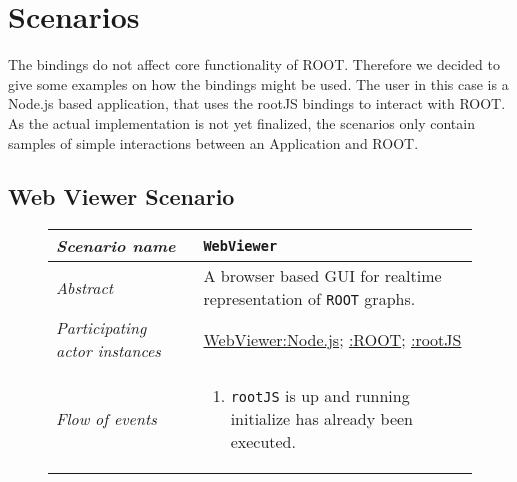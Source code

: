 \section{Scenarios}

The bindings do not affect core functionality of ROOT. Therefore 
we decided to give some examples on how the bindings might be used. The 
user in this case is a Node.js based application, that uses the rootJS bindings 
to interact with ROOT. As the actual implementation is not yet 
finalized, the scenarios only contain samples of simple interactions 
between an Application and ROOT.

\subsection{Web Viewer Scenario}
\begin{figure}[htb]
	\centering
	\begin{longtable}{p{3cm} @{\hskip 1cm} p{12cm}}
		\hline
		
		\textit{Scenario name} &  \texttt{WebViewer}\\
		\hline
	
		\textit{Abstract} & A browser based GUI for realtime representation of \texttt{ROOT} graphs.\\
		\hline
	
		\textit{Participating actor instances} & \underline{WebViewer:Node.js}; \underline{:ROOT}; \underline{:rootJS}\\
		\hline
	
		\textit{Flow of events} & 
		\begin{enumerate}
			\item \texttt{rootJS} is up and running initialize has already been executed.
			

\end{enumerate}
\end{longtable}
\end{figure}
